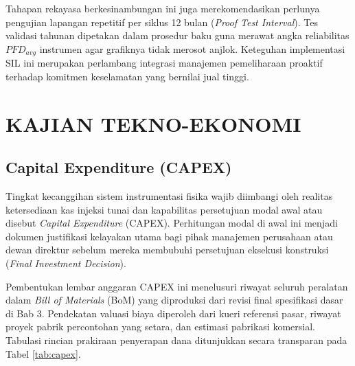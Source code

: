 \documentclass[12pt, a4paper]{report}
\begin{document}
Tahapan rekayasa berkesinambungan ini juga merekomendasikan perlunya pengujian lapangan repetitif per siklus 12 bulan (\textit{Proof Test Interval}). Tes validasi tahunan dipetakan dalam prosedur baku guna merawat angka reliabilitas $PFD_{avg}$ instrumen agar grafiknya tidak merosot anjlok. Keteguhan implementasi SIL ini merupakan perlambang integrasi manajemen pemeliharaan proaktif terhadap komitmen keselamatan yang bernilai jual tinggi.

\chapter{KAJIAN TEKNO-EKONOMI}

\section{Capital Expenditure (CAPEX)}
Tingkat kecanggihan sistem instrumentasi fisika wajib diimbangi oleh realitas ketersediaan kas injeksi tunai dan kapabilitas persetujuan modal awal atau disebut \textit{Capital Expenditure} (CAPEX). Perhitungan modal di awal ini menjadi dokumen justifikasi kelayakan utama bagi pihak manajemen perusahaan atau dewan direktur sebelum mereka membubuhi persetujuan eksekusi konstruksi (\textit{Final Investment Decision}).

Pembentukan lembar anggaran CAPEX ini menelusuri riwayat seluruh peralatan dalam \textit{Bill of Materials} (BoM) yang diproduksi dari revisi final spesifikasi dasar di Bab 3. Pendekatan valuasi biaya diperoleh dari kueri referensi pasar, riwayat proyek pabrik percontohan yang setara, dan estimasi pabrikasi komersial. Tabulasi rincian prakiraan penyerapan dana ditunjukkan secara transparan pada Tabel \ref{tab:capex}.

\begin{table}[htbp]
\centering
\caption{Rincian Estimasi Perolehan Dana Capital Expenditure (CAPEX)}
\label{tab:capex}
\end{table}
\end{document}
